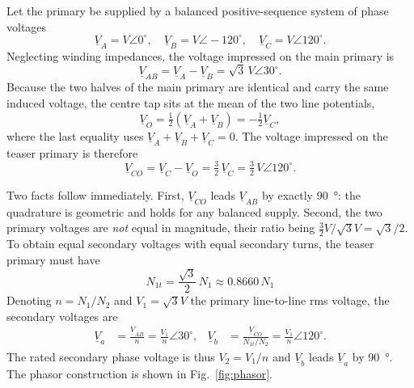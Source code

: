 \documentclass[11pt,a4paper]{article}
\newcommand{\ph}[1]{\underline{#1}}
\begin{document}
Let the primary be supplied by a balanced positive-sequence system of phase
voltages
\begin{equation}
\ph{V}_A = V\!\angle 0^\circ,\quad
\ph{V}_B = V\!\angle\!-\!120^\circ,\quad
\ph{V}_C = V\!\angle 120^\circ .
\end{equation}
Neglecting winding impedances, the voltage impressed on the main primary is
\begin{equation}
\ph{V}_{AB} = \ph{V}_A - \ph{V}_B = \sqrt{3}\,V\!\angle 30^\circ .
\end{equation}
Because the two halves of the main primary are identical and carry the same
induced voltage, the centre tap sits at the mean of the two line potentials,
\begin{equation}
\ph{V}_O = \tfrac{1}{2}\left(\ph{V}_A + \ph{V}_B\right) = -\tfrac{1}{2}\ph{V}_C ,
\end{equation}
where the last equality uses $\ph{V}_A+\ph{V}_B+\ph{V}_C = 0$. The voltage
impressed on the teaser primary is therefore
\begin{equation}
\ph{V}_{CO} = \ph{V}_C - \ph{V}_O = \tfrac{3}{2}\,\ph{V}_C
            = \tfrac{3}{2}\,V\!\angle 120^\circ .
\end{equation}

Two facts follow immediately. First, $\ph{V}_{CO}$ leads $\ph{V}_{AB}$ by
exactly \SI{90}{\degree}: the quadrature is geometric and holds for any balanced
supply. Second, the two primary voltages are \emph{not} equal in magnitude,
their ratio being $\tfrac{3}{2}V / \sqrt{3}V = \sqrt{3}/2$. To obtain equal
secondary voltages with equal secondary turns, the teaser primary must have
\begin{equation}
\boxed{\;N_{1t} = \frac{\sqrt{3}}{2}\,N_1 \approx 0.8660\,N_1\;}
\end{equation}
Denoting $n = N_1/N_2$ and $V_1 = \sqrt{3}V$ the primary line-to-line rms
voltage, the secondary voltages are
\begin{align}
\ph{V}_a &= \frac{\ph{V}_{AB}}{n} = \frac{V_1}{n}\angle 30^\circ, &
\ph{V}_b &= \frac{\ph{V}_{CO}}{N_{1t}/N_2} = \frac{V_1}{n}\angle 120^\circ .
\end{align}
The rated secondary phase voltage is thus $V_2 = V_1/n$ and $\ph{V}_b$ leads
$\ph{V}_a$ by \SI{90}{\degree}. The phasor construction is shown in
Fig.~\ref{fig:phasor}.
\end{document}

